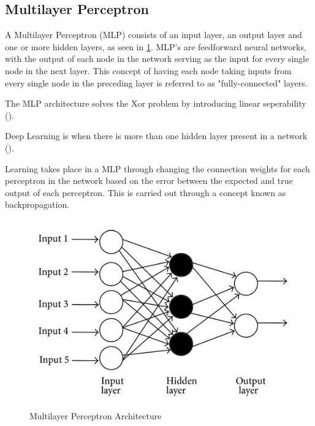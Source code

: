 \documentclass[12pt]{report}
\begin{document}
\subsection{Multilayer Perceptron}
\begin{flushleft}
A Multilayer Perceptron (MLP) consists of an input layer, an output layer and one or more hidden layers, as seen in \ref{fig:mlp}. MLP's are feedforward neural networks, with the output of each node in the network serving as the input for every single node in the next layer. This concept of having each node taking inputs from every single node in the preceding layer is referred to as "fully-connected" layers.

 The MLP architecture solves the Xor problem by introducing linear seperability (\cite{Singh2016MinimumCM}).

Deep Learning is when there is more than one hidden layer present in a network (\cite{o2015introduction}). 

Learning takes place in a MLP through changing the connection weights for each perceptron in the network based on the error between the expected and true output of each perceptron. This is carried out through a concept known as backpropagation.
\end{flushleft}

\vspace{0.5cm}
\begin{figure}[ht!]
	\centering
	\includegraphics[width=12cm]{mlp}
	\caption{Multilayer Perceptron Architecture}
	\label{fig:mlp}
\end{figure}
\end{document}
